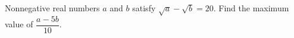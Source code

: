 Nonnegative real numbers $a$ and $b$ satisfy $\sqrt a-\sqrt b=20$. Find the maximum value of $\dfrac{a-5b}{10}$.
